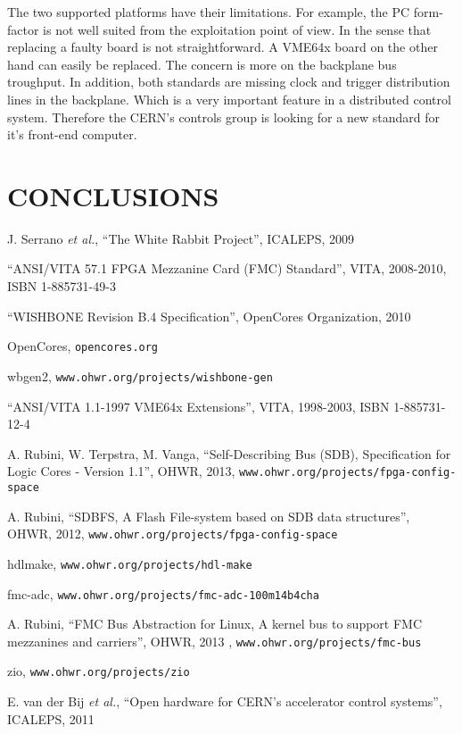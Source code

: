\documentclass{JAC2003}
\begin{document}
The two supported platforms have their limitations.
For example, the PC form-factor is not well suited from the exploitation point of view.
In the sense that replacing a faulty board is not straightforward.
A VME64x board on the other hand can easily be replaced. The concern is more on the backplane bus troughput.
In addition, both standards are missing clock and trigger distribution lines in the backplane. Which is a very important feature in a distributed control system.
Therefore the CERN's controls group is looking for a new standard for it's front-end computer.


\section{CONCLUSIONS}


\begin{thebibliography}{99} %

J. Serrano \textit{et al.}, ``The White Rabbit Project'', ICALEPS, 2009

``ANSI/VITA 57.1 FPGA Mezzanine Card (FMC) Standard'', VITA, 2008-2010, ISBN 1-885731-49-3

``WISHBONE Revision B.4 Specification'', OpenCores Organization, 2010

OpenCores, \texttt{opencores.org}

wbgen2, \texttt{www.ohwr.org/projects/wishbone-gen}

``ANSI/VITA 1.1-1997 VME64x Extensions'', VITA, 1998-2003, ISBN 1-885731-12-4

A. Rubini, W. Terpstra, M. Vanga, ``Self-Describing Bus (SDB), Specification for Logic Cores - Version 1.1'', OHWR, 2013, \texttt{www.ohwr.org/projects/fpga-config-space}

A. Rubini, ``SDBFS, A Flash File-system based on SDB data structures'', OHWR, 2012, \texttt{www.ohwr.org/projects/fpga-config-space}

hdlmake, \texttt{www.ohwr.org/projects/hdl-make}

fmc-adc, \texttt{www.ohwr.org/projects/fmc-adc-100m14b4cha}

A. Rubini, ``FMC Bus Abstraction for Linux, A kernel bus to support FMC mezzanines and carriers'', OHWR, 2013 , \texttt{www.ohwr.org/projects/fmc-bus}

zio, \texttt{www.ohwr.org/projects/zio}

E. van der Bij \textit{et al.}, ``Open hardware for CERN's accelerator control systems'', ICALEPS, 2011

\end{thebibliography}
\end{document}

